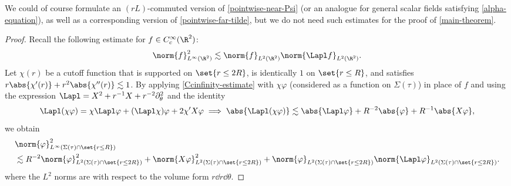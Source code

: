 \documentclass[10pt, reqno]{amsart}
\begin{document}
\begin{remark}
We could of course formulate an \((rL)\)-commuted version of \cref{pointwise-near-Psi}
(or an analogue for general scalar fields satisfying \cref{alpha-equation}), as
well as a corresponding version of \cref{pointwise-far-tilde}, but we do not need
such estimates for the proof of \cref{main-theorem}.
\end{remark}
\begin{proof}
Recall the following estimate for \(f\in C_c^\infty(\R^2)\):
\begin{equation}\label{Ccinfinity-estimate}
\norm{f}_{L^\infty(\R^2)}^2\lesssim \norm{f}_{L^2(\R^2)}\norm{\Lapl f}_{L^2(\R^2)}.
\end{equation}
Let \(\chi{}(r)\) be a cutoff function that is supported on \(\set{r\le 2R}\),
is identically \(1\) on \(\set{r\le R}\), and satisfies \(r\abs{\chi{}'(r)} +
r^2\abs{\chi{}''(r)}\lesssim 1\). By applying \cref{Ccinfinity-estimate} with \(\chi{}\varphi{}\)
(considered as a function on \(\Sigma{}(\tau{})\)) in place of \(f\) and using the expression
\(\Lapl =X^2 + r^{-1}X + r^{-2}\partial_\theta^2\) and the identity
\begin{equation}
\Lapl (\chi{}\varphi{}) = \chi{}\Lapl \varphi{} + (\Lapl \chi{})\varphi{} + 2\chi{}'X\varphi{}\implies \abs{\Lapl (\chi{}\varphi{})}\lesssim \abs{\Lapl \varphi{}} + R^{-2}\abs{\varphi{}} + R^{-1}\abs{X\varphi{}},
\end{equation}
we obtain
\begin{equation}\label{Cc-estimate}
\begin{split}
&\norm{\varphi{}}_{L^\infty(\Sigma{}(\tau{})\cap \set{r\le R})}^2 \\
&\lesssim R^{-2}\norm{\varphi{}}_{L^2(\Sigma{}(\tau{})\cap \set{r\le 2R})}^2 + \norm{X\varphi{}}_{L^2(\Sigma{}(\tau{})\cap \set{r\le 2R})}^2 + \norm{\varphi{}}_{L^2(\Sigma{}(\tau{})\cap \set{r\le 2R})}\norm{\Lapl \varphi{}}_{L^2(\Sigma{}(\tau{})\cap \set{r\le 2R})}.
\end{split}
\end{equation}
where the \(L^2\) norms are with respect to the volume form \(r\dd{}r\dd{}\theta{}\).


\end{proof}
\end{document}
